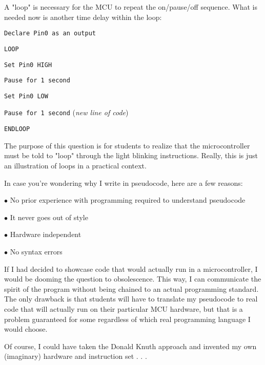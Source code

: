 





A "loop" is necessary for the MCU to repeat the on/pause/off sequence.  What is needed now is another time delay within the loop:

\vskip 10pt

\noindent
{}

{\tt Declare Pin0 as an output}

{\tt LOOP}

\hskip 10pt {\tt Set Pin0 HIGH}

\hskip 10pt {\tt Pause for 1 second}

\hskip 10pt {\tt Set Pin0 LOW}

\hskip 10pt {\tt Pause for 1 second} ({\it new line of code})

{\tt ENDLOOP}

\vskip 10pt







The purpose of this question is for students to realize that the microcontroller must be told to "loop" through the light blinking instructions.  Really, this is just an illustration of loops in a practical context.

\vskip 10pt

In case you're wondering why I write in pseudocode, here are a few reasons:

\medskip
\goodbreak
\item{$\bullet$} No prior experience with programming required to understand pseudocode
\item{$\bullet$} It never goes out of style
\item{$\bullet$} Hardware independent
\item{$\bullet$} No syntax errors
\medskip

If I had decided to showcase code that would actually run in a microcontroller, I would be dooming the question to obsolescence.  This way, I can communicate the spirit of the program without being chained to an actual programming standard.  The only drawback is that students will have to translate my pseudocode to real code that will actually run on their particular MCU hardware, but that is a problem guaranteed for some regardless of which real programming language I would choose.

Of course, I could have taken the Donald Knuth approach and invented my own (imaginary) hardware and instruction set . . . 





